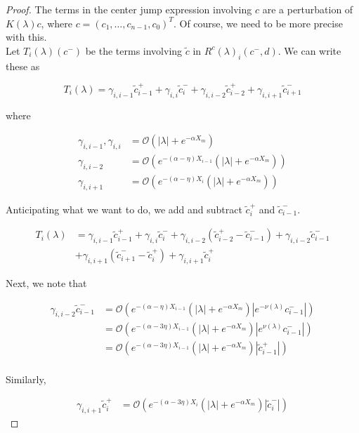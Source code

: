 \documentclass[thesis.tex]{subfiles}
\begin{document}
\begin{lemma}
\begin{proof}
The terms in the center jump expression involving $c$ are a perturbation of $K(\lambda)c$, where $c = (c_1, \dots, c_{n-1}, c_0)^T$. Of course, we need to be more precise with this.\\

Let $T_i(\lambda)(c^-)$ be the terms involving $\tilde{c}$ in $R^c(\lambda)_i(c^-, d)$. We can write these as

\[
T_i(\lambda) = \gamma_{i,i-1} \tilde{c}_{i-1}^+ + \gamma_{i,i} \tilde{c}_{i}^- + \gamma_{i,i-2} \tilde{c}_{i-2}^+ + \gamma_{i,i+1} \tilde{c}_{i+1}^-
\] 

where

\begin{align*}
\gamma_{i,i-1}, \gamma_{i,i} &= \mathcal{O}(|\lambda| + e^{-\alpha X_m}) \\
\gamma_{i,i-2} &= \mathcal{O}(e^{-(\alpha - \eta) X_{i-1}}(|\lambda| + e^{-\alpha X_m})) \\
\gamma_{i,i+1} &= \mathcal{O}(e^{-(\alpha - \eta) X_i}(|\lambda| + e^{-\alpha X_m}))
\end{align*}

Anticipating what we want to do, we add and subtract $\tilde{c}_i^+$ and $\tilde{c}_{i-1}^-$.

\begin{align*}
T_i(\lambda) &= \gamma_{i,i-1} \tilde{c}_{i-1}^+ + \gamma_{i,i} \tilde{c}_{i}^- + \gamma_{i,i-2} ( \tilde{c}_{i-2}^+ - \tilde{c}_{i-1}^-) + \gamma_{i,i-2} \tilde{c}_{i-1}^- \\
& + \gamma_{i,i+1} (\tilde{c}_{i+1}^- - \tilde{c}_i^+) + \gamma_{i,i+1} \tilde{c}_i^+
\end{align*}

Next, we note that

\begin{align*}
\gamma_{i,i-2} \tilde{c}_{i-1}^- &= \mathcal{O}(e^{-(\alpha - \eta) X_{i-1}}(|\lambda| + e^{-\alpha X_m})|e^{-\nu(\lambda)}c_{i-1}^-|) \\
&= \mathcal{O}(e^{-(\alpha - 3 \eta) X_{i-1}}(|\lambda| + e^{-\alpha X_m})|e^{\nu(\lambda)}c_{i-1}^-|) \\
&= \mathcal{O}(e^{-(\alpha - 3 \eta) X_{i-1}}(|\lambda| + e^{-\alpha X_m})|\tilde{c}_{i-1}^+|) \\
\end{align*}

Similarly,

\begin{align*}
\gamma_{i,i+1} \tilde{c}_i^+ &= \mathcal{O}(e^{-(\alpha - 3 \eta) X_i}(|\lambda| + e^{-\alpha X_m})|\tilde{c}_i^-|)
\end{align*}


\end{proof}
\end{lemma}
\end{document}
